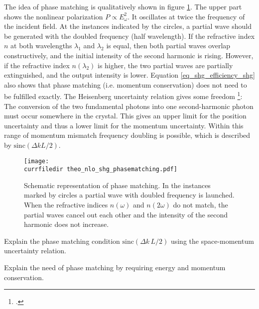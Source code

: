The idea of phase matching is qualitatively shown in figure
\ref{fig_shg_phase_matching}. The upper part shows the nonlinear 
polarization $P \propto E_{\omega}^2$. It oscillates
at twice the frequency of the incident field. At the instances indicated by the circles,  a partial wave should  be generated with
the doubled frequency (half wavelength). If the
refractive index $n$ at both wavelengths $\lambda_1$ and
$\lambda_2$ is equal, then both partial waves overlap
constructively, and the initial intensity of the second harmonic
is rising. However, if the refractive index $n(\lambda_2)$ is higher,
the two partial waves are partially extinguished, and the
output intensity is lower. Equation
\ref{eq_shg_efficiency_shg} also shows that 
phase matching (i.e. momentum conservation) does not need to be fulfilled  exactly.  The Heisenberg uncertainty relation gives some freedom
\footcite{Demtroeder_laser,SalehTeich1991}:
The conversion of the two fundamental photons into one second-harmonic photon 
must occur somewhere in the crystal. This gives an upper limit for  the position uncertainty and thus a lower limit for the momentum uncertainty.
Within  this  range of momentum mismatch frequency doubling  is possible, which is described by $\text{sinc}(\Delta k L/2)$.




\begin{figure}
\center
\texttt{[image: \\currfiledir theo\_nlo\_shg\_phasematching.pdf]}
\caption{Schematic representation of 
phase matching.
In the instances marked by circles a
partial wave with doubled frequency is launched. When the
refractive indices $n(\omega)$ and $n(2 \omega)$ do not
match, the partial waves cancel out each other  and
the intensity of the second harmonic does not increase.}
\label{fig_shg_phase_matching}
\end{figure}


\begin{questions}

\item Explain the phase matching condition $\text{sinc} ( \Delta k \, L /2 )$ using the space-momentum uncertainty relation.

\item Explain the need of phase matching by requiring energy and momentum conservation.

\end{questions}


